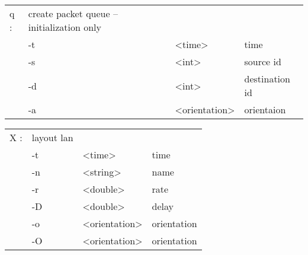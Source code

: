   \begin{tabular}{llll}
  q : & create packet queue -- initialization only & & \\
    &  -t & <time> & time \\
    &  -s & <int> & source id \\
    &  -d & <int> & destination id \\
    &  -a & <orientation> & orientaion \\
  \end{tabular}

  \begin{tabular}{llll}
  X : & layout lan & & \\
    &  -t & <time> & time \\
    &  -n & <string> & name \\
    &  -r & <double> & rate \\
    &  -D & <double> & delay \\
    &  -o & <orientation> & orientation \\
    &  -O & <orientation> & orientation \\
  \end{tabular}


